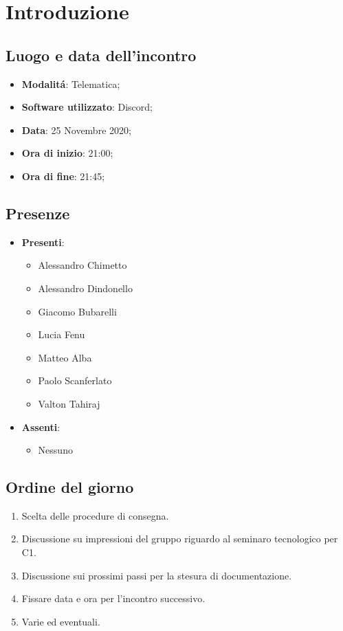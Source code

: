 \documentclass[]{article}
\begin{document}
	
	
	
	\newpage
	
	\section{Introduzione}
	\subsection{Luogo e data dell'incontro}
	\begin{itemize}
		\item \textbf{Modalitá}: Telematica;
		\item \textbf{Software utilizzato}: Discord;
		\item \textbf{Data}: 25 Novembre 2020;
		\item \textbf{Ora di inizio}: 21:00;
		\item \textbf{Ora di fine}: 21:45;
	\end{itemize}
	
	\subsection{Presenze}
	\begin{itemize}
		\item \textbf{Presenti}: 
		\begin{itemize}
			\item Alessandro Chimetto
			\item Alessandro Dindonello
			\item Giacomo Bubarelli
			\item Lucia Fenu
			\item Matteo Alba
			\item Paolo Scanferlato
			\item Valton Tahiraj
		\end{itemize}
		\item \textbf{Assenti}:
		\begin{itemize}
			\item Nessuno
		\end{itemize}
	\end{itemize}
	
	
	\subsection{Ordine del giorno}
	\begin{enumerate}
		\item Scelta delle procedure di consegna.
		\item Discussione su impressioni del gruppo riguardo al seminaro
		tecnologico per C1.
		\item Discussione sui prossimi passi per la stesura di documentazione.
		\item Fissare data e ora per l'incontro successivo.
		\item Varie ed eventuali.
	\end{enumerate}
	
\end{document}
